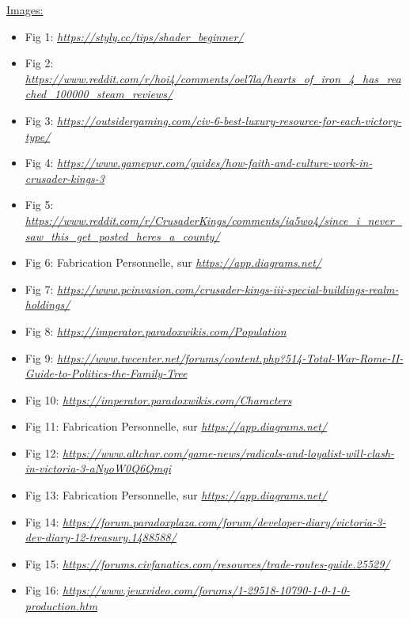 \documentclass{article}
\begin{document}
        \underline{Images:}
            \begin{itemize}
                \item Fig 1: \textit{\url{https://styly.cc/tips/shader_beginner/}}
                \item Fig 2: \textit{\url{https://www.reddit.com/r/hoi4/comments/oel7la/hearts_of_iron_4_has_reached_100000_steam_reviews/}}
                \item Fig 3: \textit{\url{https://outsidergaming.com/civ-6-best-luxury-resource-for-each-victory-type/}} 
                \item Fig 4: \textit{\url{https://www.gamepur.com/guides/how-faith-and-culture-work-in-crusader-kings-3}}
                \item Fig 5: \textit{\url{https://www.reddit.com/r/CrusaderKings/comments/ia5wo4/since_i_never_saw_this_get_posted_heres_a_county/}}
                \item Fig 6: Fabrication Personnelle, sur \textit{\url{https://app.diagrams.net/}}
                \item Fig 7: \textit{\url{https://www.pcinvasion.com/crusader-kings-iii-special-buildings-realm-holdings/}}
                \item Fig 8: \textit{\url{https://imperator.paradoxwikis.com/Population}}
                \item Fig 9: \textit{\url{https://www.twcenter.net/forums/content.php?514-Total-War-Rome-II-Guide-to-Politics-the-Family-Tree}}
                \item Fig 10: \textit{\url{https://imperator.paradoxwikis.com/Characters}}
                \item Fig 11: Fabrication Personnelle, sur \textit{\url{https://app.diagrams.net/}}
                \item Fig 12: \textit{\url{https://www.altchar.com/game-news/radicals-and-loyalist-will-clash-in-victoria-3-aNyoW0Q6Qmqi}}
                \item Fig 13: Fabrication Personnelle, sur \textit{\url{https://app.diagrams.net/}}
                \item Fig 14: \textit{\url{https://forum.paradoxplaza.com/forum/developer-diary/victoria-3-dev-diary-12-treasury.1488588/}}
                \item Fig 15: \textit{\url{https://forums.civfanatics.com/resources/trade-routes-guide.25529/}}
                \item Fig 16: \textit{\url{https://www.jeuxvideo.com/forums/1-29518-10790-1-0-1-0-production.htm}}

\end{itemize}
\end{document}
